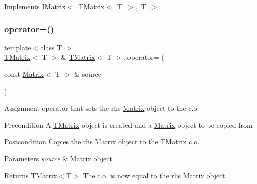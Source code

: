 Implements \mbox{\hyperlink{class_i_matrix_a9eeb68de7e1d37d1aab439c78fea9be3}{I\+Matrix$<$ T\+Matrix$<$ T $>$, T $>$}}.

\mbox{\label{class_t_matrix_a549cf0f446ec9c6257f4c3f952b2550a}} 
\subsubsection{\texorpdfstring{operator=()}{operator=()}\hspace{0.1cm}{\footnotesize\ttfamily [2/2]}}
{\footnotesize\ttfamily template$<$class T $>$ \\
\mbox{\hyperlink{class_t_matrix}{T\+Matrix}}$<$ T $>$ \& \mbox{\hyperlink{class_t_matrix}{T\+Matrix}}$<$ T $>$\+::operator= (\begin{DoxyParamCaption}\item[{const \mbox{\hyperlink{class_matrix}{Matrix}}$<$ T $>$ \&}]{source }\end{DoxyParamCaption})}



Assignment operator that sets the rhs \mbox{\hyperlink{class_matrix}{Matrix}} object to the c.\+o. 

\begin{DoxyPrecond}{Precondition}
A \mbox{\hyperlink{class_t_matrix}{T\+Matrix}} object is created and a \mbox{\hyperlink{class_matrix}{Matrix}} object to be copied from 
\end{DoxyPrecond}
\begin{DoxyPostcond}{Postcondition}
Copies the rhs \mbox{\hyperlink{class_matrix}{Matrix}} object to the \mbox{\hyperlink{class_t_matrix}{T\+Matrix}} c.\+o. 
\end{DoxyPostcond}

\begin{DoxyParams}{Parameters}
{\em source} & \mbox{\hyperlink{class_matrix}{Matrix}} object \\
\hline
\end{DoxyParams}
\begin{DoxyReturn}{Returns}
T\+Matrix$<$\+T$>$ The c.\+o. is now equal to the rhs \mbox{\hyperlink{class_matrix}{Matrix}} object 
\end{DoxyReturn}
\mbox{\label{class_t_matrix_adf8f6ca427e37e867e89c215f4f9ef0b}} 
